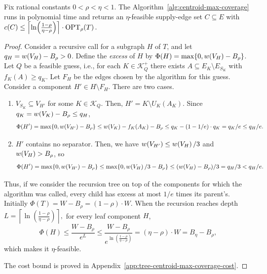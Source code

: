 \begin{theorem}\label{thm:tree-centroid-max-coverage}
    Fix rational constants $0<\rho<\eta<1$. The Algorithm~\ref{alg:centroid-max-coverage} runs in polynomial time and returns an $\eta$-feasible supply-edge set $C\subseteq E$ with $
        c(C)\leq\mathopen{}\left\lceil \ln\mathopen{}\left( \frac{1-\rho}{\eta-\rho} \right) \right\rceil\cdot\textup{OPT}_{\rho}\mathopen{}\left( T \right).$
\end{theorem}
\begin{proof}
    Consider a recursive call for a subgraph $H$ of $T$, and let $q_H=w\mathopen{}\left( V_H \right)-B_\rho>0$. 
    Define the \emph{excess} of $H$ by $\Phi(H)=\max\mathopen{}\left\{ 0,w\mathopen{}\left( V_H \right)-B_\rho \right\}$.
    Let $Q$ be a feasible guess, i.e., for each $K\in\mathcal{K}_Q^+$ there exists $A\subseteq E_K\setminus E_{S_K}$ with $f_K(A)\geq q_K$. Let $F_H$ be the edges chosen by the algorithm for this guess. Consider a component $H'\in H\setminus F_H$. There are two cases.
    \begin{enumerate}
        \item $V_{S_K}\subseteq V_{H'}$ for some $K\in \mathcal{K}_Q$. Then, $H'=K\setminus U_K(A_K)$. Since $q_K=w\mathopen{}\left( V_K \right)-B_\rho\leq q_H$,
    \[
            \Phi(H')=\max\mathopen{}\left\{ 0,w\mathopen{}\left( V_{H'} \right)-B_\rho \right\}\leq w\mathopen{}\left( V_{K} \right)-f_K\mathopen{}\left( A_K \right)-B_\rho
        \leq q_K-(1-1/e)\cdot q_K
        =q_K/e\leq q_H/e.
    \]
    \item $H'$ contains no separator. Then, we have $w\mathopen{}\left( V_{H'} \right)\leq w\mathopen{}\left( V_H \right)/3$ and $w\mathopen{}\left( V_H \right)>B_\rho$, so
    \[
        \Phi(H')=\max\mathopen{}\left\{ 0,w\mathopen{}\left( V_{H'} \right)-B_\rho \right\}
        \leq\max\mathopen{}\left\{ 0,w\mathopen{}\left( V_H \right)/3-B_\rho \right\}\leq(w\mathopen{}\left( V_H \right)-B_\rho)/3=q_H/3<q_H/e.
    \]
    \end{enumerate} 
    Thus, if we consider the recursion tree on top of the components for which the algorithm was called, every child has excess at most $1/e$ times its parent's. Initially $\Phi(T)=W-B_\rho=(1-\rho)\cdot W$. When the recursion reaches depth
    $
        L=\left\lceil\ln\left(\frac{1-\rho}{\eta-\rho}\right)\right\rceil,
    $
    for every leaf component $H$,
    \[
        \Phi(H)\leq\frac{W-B_\rho}{e^L}\leq\frac{W-B_\rho}{e^{\ln\left(\frac{1-\rho}{\eta-\rho}\right)}}=(\eta-\rho)\cdot W=B_\eta-B_\rho,
    \]
    which makes it $\eta$-feasible.

    The cost bound is proved in Appendix~\ref{app:tree-centroid-max-coverage-cost}.
\end{proof}

